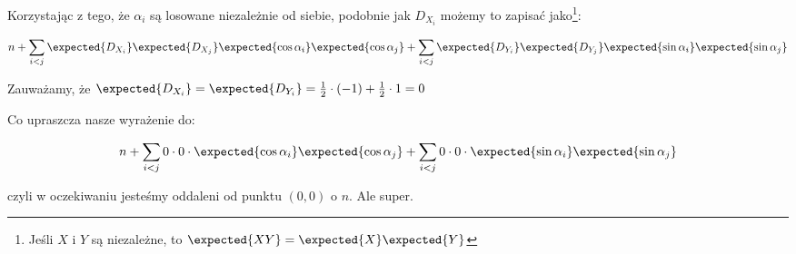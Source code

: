Korzystając z tego, że \(\alpha_i\) są losowane niezależnie od siebie, podobnie jak \(D_{X_i}\) możemy to zapisać jako\footnote{Jeśli \(X\) i \(Y\) są niezależne, to \(\expected{XY} = \expected{X}\expected{Y}\)}:

\[
	n + \sum_{i < j} \expected{D_{X_i}}\expected{D_{X_j}} \expected{ \cos{\alpha_i}} \expected{\cos{\alpha_j}} +
	{\sum_{i < j} \expected{D_{Y_i}} \expected{D_{Y_j}} \expected{\sin{\alpha_i}} \expected{\sin{\alpha_j}}}
\]

Zauważamy, że \( \expected{D_{X_i}} = \expected{D_{Y_i}} = \frac{1}{2} \cdot (-1) + \frac{1}{2} \cdot 1 = 0\)

Co upraszcza nasze wyrażenie do:

\[
	n + \sum_{i < j} 0 \cdot 0 \cdot \expected{ \cos{\alpha_i}} \expected{\cos{\alpha_j}} +
	{\sum_{i < j} 0 \cdot 0 \cdot  \expected{\sin{\alpha_i}} \expected{\sin{\alpha_j}}}
\]

czyli w oczekiwaniu jesteśmy oddaleni od punktu \((0, 0)\) o \(n\). Ale super.